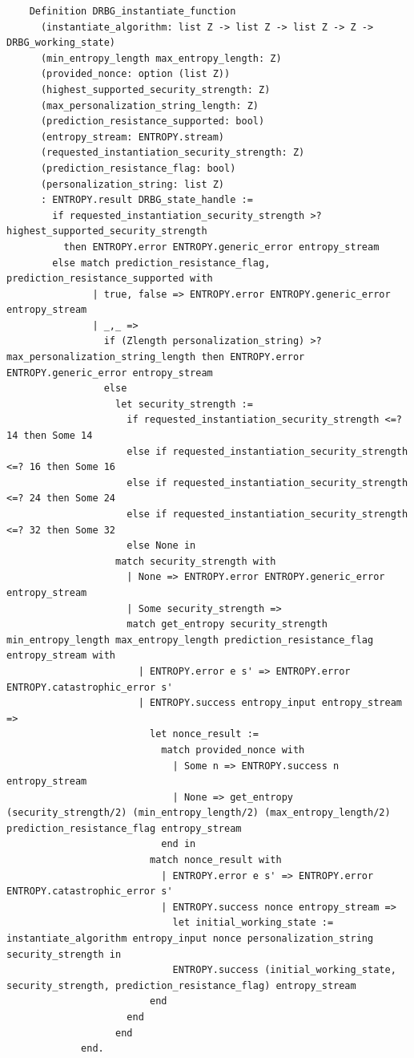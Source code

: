 \documentclass[pageno]{jpaper}
\begin{document}
\begin{lstlisting}
    Definition DRBG_instantiate_function
      (instantiate_algorithm: list Z -> list Z -> list Z -> Z -> DRBG_working_state)
      (min_entropy_length max_entropy_length: Z)
      (provided_nonce: option (list Z))
      (highest_supported_security_strength: Z)
      (max_personalization_string_length: Z)
      (prediction_resistance_supported: bool)
      (entropy_stream: ENTROPY.stream)
      (requested_instantiation_security_strength: Z)
      (prediction_resistance_flag: bool)
      (personalization_string: list Z)
      : ENTROPY.result DRBG_state_handle :=
        if requested_instantiation_security_strength >? highest_supported_security_strength
          then ENTROPY.error ENTROPY.generic_error entropy_stream
        else match prediction_resistance_flag, prediction_resistance_supported with
               | true, false => ENTROPY.error ENTROPY.generic_error entropy_stream
               | _,_ =>
                 if (Zlength personalization_string) >? max_personalization_string_length then ENTROPY.error ENTROPY.generic_error entropy_stream
                 else
                   let security_strength :=
                     if requested_instantiation_security_strength <=? 14 then Some 14
                     else if requested_instantiation_security_strength <=? 16 then Some 16
                     else if requested_instantiation_security_strength <=? 24 then Some 24
                     else if requested_instantiation_security_strength <=? 32 then Some 32
                     else None in
                   match security_strength with
                     | None => ENTROPY.error ENTROPY.generic_error entropy_stream
                     | Some security_strength =>
                     match get_entropy security_strength min_entropy_length max_entropy_length prediction_resistance_flag entropy_stream with
                       | ENTROPY.error e s' => ENTROPY.error ENTROPY.catastrophic_error s'
                       | ENTROPY.success entropy_input entropy_stream =>
                         let nonce_result :=
                           match provided_nonce with
                             | Some n => ENTROPY.success n entropy_stream
                             | None => get_entropy (security_strength/2) (min_entropy_length/2) (max_entropy_length/2) prediction_resistance_flag entropy_stream
                           end in
                         match nonce_result with
                           | ENTROPY.error e s' => ENTROPY.error ENTROPY.catastrophic_error s'
                           | ENTROPY.success nonce entropy_stream =>
                             let initial_working_state := instantiate_algorithm entropy_input nonce personalization_string security_strength in
                             ENTROPY.success (initial_working_state, security_strength, prediction_resistance_flag) entropy_stream
                         end
                     end
                   end
             end.
\end{lstlisting}
\end{document}
